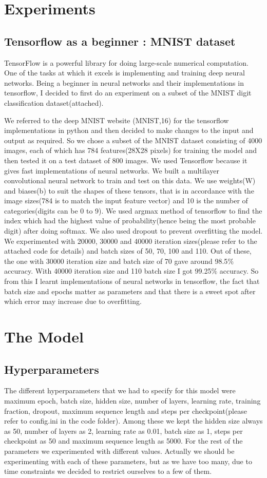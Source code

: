 \documentclass[11pt]{article}
\begin{document}
\section{Experiments}
\subsection{Tensorflow as a beginner : MNIST dataset}
TensorFlow is a powerful library for doing large-scale numerical computation. 
One of the tasks at which it excels is implementing and training deep neural networks.
Being a beginner in neural networks and their implementations in tensorflow, I decided to first do an
experiment on a subset of the MNIST digit classification dataset(attached).

We referred to the deep MNIST website (MNIST,16) for the tensorflow implementations in python and then decided to make 
changes to the input and output as required. So we chose a subset of the MNIST dataset consisting of 4000 images, each
of which has 784 features(28X28 pixels) for training the model and then tested it on a test dataset of 800 images.
We used Tensorflow because it gives fast implementations of neural networks. We built a multilayer convolutional 
neural network to train and test on this data. We use weights(W) and biases(b) 
to suit the shapes of these tensors, that is in accordance with the image sizes(784 is to match the input 
feature vector) and 10 is the number of categories(digits can be 0 to 9). We used argmax method of tensorflow to find the 
index which had the highest value of probability(hence being the most probable digit) after doing softmax. 
We also used dropout to prevent overfitting the model. 
We experimented with 20000, 30000 and 40000 iteration sizes(please refer to the attached code for details) and 
batch sizes of 50, 70, 100 and 110. Out of these, the one with 30000 iteration size and batch size of 70 gave around 
98.5$\%$ accuracy. With 40000 iteration size and 110 batch size I got 99.25$\%$ accuracy.
So from this I learnt implementations of neural networks in tensorflow, the fact that batch size and epochs matter
as parameters and that there is a sweet spot after which error may increase due to overfitting.


\section{The Model}
\subsection{Hyperparameters}
The different hyperparameters that we had to specify for this model were 
maximum epoch, batch size, hidden size, number of layers, learning rate, training fraction, dropout, maximum sequence length 
and steps per checkpoint(please refer to config.ini in the code folder).
Among these we kept the hidden size always as 50, number of layers as 2, learning rate as 0.01, batch size as 1,
steps per checkpoint as 50 and maximum sequence length as 5000. 
For the rest of the parameters we experimented with different values. Actually we should be 
experimenting with each of these parameters, but as we have too many, due to time constraints we decided to 
restrict ourselves to a few of them.
\end{document}
